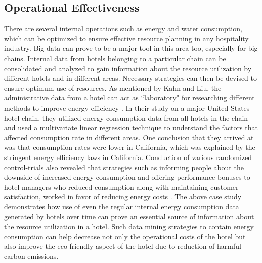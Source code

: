 \documentclass[sigconf]{acmart}
\begin{document}
\subsection{Operational Effectiveness}
There are several internal operations such as energy and water consumption, which can be optimized to ensure effective resource planning in any hospitality industry. Big data can prove to be a major tool in this area too, especially for big chains. Internal data from hotels belonging to a particular chain can be consolidated and analyzed to gain information about the resource utilization by different hotels and in different areas. Necessary strategies can then be devised to ensure optimum use of resources.
\newline As mentioned by Kahn and Liu, the administrative data from a hotel can act as ``laboratory" for researching different methods to improve energy efficiency \cite {kahnliu10}. In their study on a major United States hotel chain, they utilized energy consumption data from all hotels in the chain and used a multivariate linear regression technique to understand the factors that affected consumption rate in different areas. One conclusion that they arrived at was that consumption rates were lower in California, which was explained by the stringent energy efficiency laws in California. Conduction of various randomized control-trials also revealed that strategies such as informing people about the downside of increased energy consumption and offering performance bonuses to hotel managers who reduced consumption along with maintaining customer satisfaction, worked in favor of reducing energy costs \cite {kahnliu10}.
\newline The above case study demonstrates how use of even the regular internal energy consumption data generated by hotels over time can prove an essential source of information about the resource utilization in a hotel. Such data mining strategies to contain energy consumption can help decrease not only the operational costs of the hotel but also improve the eco-friendly aspect of the hotel due to reduction of harmful carbon emissions.
\end{document}
